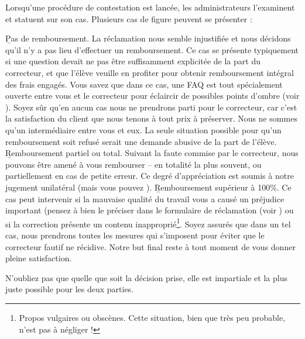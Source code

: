 ﻿Lorsqu'une procédure de contestation est lancée, les administrateurs l'examinent et statuent sur son cas. Plusieurs cas de figure peuvent se présenter :

\begin{itemize}
\li \b{Pas de remboursement.} La réclamation nous semble injustifiée et nous décidons qu'il n'y a pas lieu d'effectuer un remboursement. Ce cas se présente typiquement si une question devait ne pas être suffisamment explicitée de la part du correcteur, et que l'élève veuille en profiter pour obtenir remboursement intégral des frais engagés. Vous savez que dans ce cas, une FAQ est tout spécialement ouverte entre vous et le correcteur pour éclaircir de possibles points d'ombre (voir ). Soyez sûr qu'en aucun cas nous ne prendrons parti pour le correcteur, car c'est la satisfaction du client que nous tenons à tout prix à préserver. Nous ne sommes qu'un intermédiaire entre vous et eux. La seule situation possible pour qu'un remboursement soit refusé serait une demande abusive de la part de l'élève.
\li \b{Remboursement partiel ou total.} Suivant la faute commise par le correcteur, nous pouvons être amené à vous rembourser -- en totalité la plus souvent, ou partiellement en cas de petite erreur. Ce degré d'appréciation est soumis à notre jugement unilatéral (mais vous pouvez ).
\li \b{Remboursement supérieur à 100\%.} Ce cas peut intervenir si la mauvaise qualité du travail vous a causé un préjudice important (pensez à bien le préciser dans le formulaire de réclamation (voir ) ou si la correction présente un contenu inapproprié\footnote{Propos vulgaires ou obscènes. Cette situation, bien que très peu probable, n'est pas à négliger !}. Soyez assurés que dans un tel cas, nous prendrons toutes les mesures qui s'imposent pour éviter que le correcteur fautif ne récidive. Notre but final reste à tout moment de vous donner pleine satisfaction.
\end{itemize}

N'oubliez pas que quelle que soit la décision prise, elle est impartiale et la plus juste possible pour les deux parties.